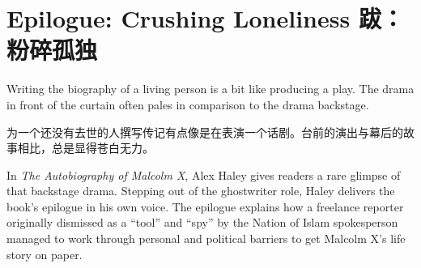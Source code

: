 

\chapter{\ifdefined\eng
Epilogue: Crushing Loneliness
\fi
\ifdefined\chs
跋：粉碎孤独
\fi}



\ifdefined\eng
Writing the biography of a living person is a bit like producing a play. The drama in front of the curtain often pales in comparison to the drama backstage.
\fi

\ifdefined\chs
为一个还没有去世的人撰写传记有点像是在表演一个话剧。台前的演出与幕后的故事相比，总是显得苍白无力。
\fi

\ifdefined\eng
In \textit{The Autobiography of Malcolm X}, Alex Haley gives readers a rare glimpse of that backstage drama. Stepping out of the ghostwriter role, Haley delivers the book's epilogue in his own voice. The epilogue explains how a freelance reporter originally dismissed as a ``tool'' and ``spy'' by the Nation of Islam spokesperson managed to work through personal and political barriers to get Malcolm X's life story on paper.
\fi

